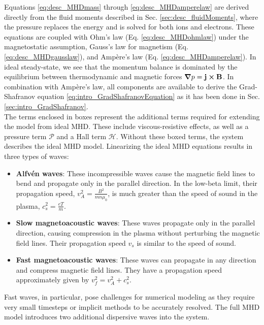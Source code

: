 Equations \ref{eq:desc_MHDmass} through \ref{eq:desc_MHDamperelaw} are derived directly from the fluid moments described in Sec. \ref{sec:desc_fluidMoments}, where the pressure replaces the energy and is solved for both ions and electrons. These equations are coupled with Ohm's law (Eq. \ref{eq:desc_MHDohmlaw}) under the magnetostatic assumption, Gauss's law for magnetism (Eq. \ref{eq:desc_MHDgausslaw}), and Ampère's law (Eq. \ref{eq:desc_MHDamperelaw}). In ideal steady-state, we see that the momentum balance is dominated by the equilibrium between thermodynamic and magnetic forces $\grad p = \mathbf{j}\cross\mathbf{B}$. In combination with Ampère's law, all components are available to derive the Grad-Shafranov equation \ref{eq:intro_GradShafranovEquation} as it has been done in Sec. \ref{sec:intro_GradShafranov}. \\
The terms enclosed in boxes represent the additional terms required for extending the model from ideal MHD. These include viscous-resistive effects, as well as a pressure term $\bm{\mathcal{P}}$ and a Hall term $\bm{\mathcal{H}}$. Without these boxed terms, the system describes the ideal MHD model. Linearizing the ideal MHD equations results in three types of waves:
\begin{itemize}
	\item \textbf{Alfvén waves}: These incompressible waves cause the magnetic field lines to bend and propagate only in the parallel direction. In the low-beta limit, their propagation speed, $v_A^2 = \frac{B^2}{mn\mu_0}$, is much greater than the speed of sound in the plasma, $c_s^2 = \frac{eT}{m}$.
	\item \textbf{Slow magnetoacoustic waves}: These waves propagate only in the parallel direction, causing compression in the plasma without perturbing the magnetic field lines. Their propagation speed $v_s$ is similar to the speed of sound.
	\item \textbf{Fast magnetoacoustic waves}: These waves can propagate in any direction and compress magnetic field lines. They have a propagation speed approximately given by $v_f^2 = v_A^2 + c_s^2$.
\end{itemize}

Fast waves, in particular, pose challenges for numerical modeling as they require very small timesteps or implicit methods to be accurately resolved. The full MHD model introduces two additional dispersive waves into the system.


